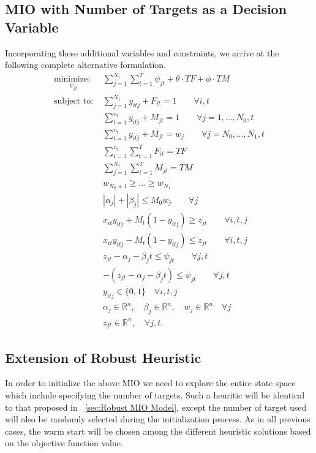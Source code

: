 \subsection{MIO with Number of Targets as a Decision Variable}
Incorporating these additional variables and constraints, we arrive at the following complete alternative formulation.
\begin{align*}
\underset{\psi_{jt}}{\text{minimize: }} & \sum_{j=1}^{N_{1}} \sum_{t=1}^{T} \psi_{jt} + \theta \cdot TF + \phi \cdot TM\\
\text{subject to: }	& \sum_{j=1}^{N_{1}} y_{itj} + F_{it} = 1 \qquad \forall i,t \nonumber\\
				& \sum_{i=1}^{n_{t}} y_{itj} + M_{jt} = 1 \qquad \forall j=1,...,N_{0},t \nonumber \\
				& \sum_{i=1}^{n_{t}} y_{itj} + M_{jt} = w_{j} \qquad \forall j=N_{0},...,N_{1},t \nonumber \\
				& \sum_{i=1}^{n_{t}} \sum_{t=1}^{T} F_{it} = TF \nonumber \\
				& \sum_{j=1}^{N_{1}} \sum_{t=1}^{T} M_{jt} = TM \nonumber \\
				& w_{N_0+1}\geq ...\geq w_{N_1} \nonumber \\
				& |\alpha_{j}|+|\beta_{j}| \leq M_{0}w_{j}\qquad \forall j \nonumber \\
				& x_{it}y_{itj} + M_{t}(1-y_{itj}) \geq z_{jt} \qquad \forall i,t,j \nonumber \\
				& x_{it}y_{itj} - M_{t}(1-y_{itj}) \leq z_{jt} \qquad \forall i,t,j \nonumber \\
				& z_{jt} - \alpha_{j} - \beta_{j}t \leq \psi_{jt} \qquad \forall j,t \nonumber \\
				& -(z_{jt} - \alpha_{j} - \beta_{j}t) \leq \psi_{jt} \qquad \forall j,t \nonumber \\
			 	& y_{itj} \in \{0,1\} \quad \forall i,t,j \nonumber \\
				& \alpha_{j} \in \mathbb{R}^n,\quad \beta_{j} \in \mathbb{R}^n,\quad w_{j} \in \mathbb{R}^n \quad \forall j \nonumber \\
				& z_{jt} \in \mathbb{R}^n, \quad \forall j,t. \nonumber
\end{align*}

\subsection{Extension of Robust Heuristic}
In order to initialize the above MIO we need to explore the entire state space which include specifying the number of targets. Such a heuritic will be identical to that proposed in \mysection~\ref{sec:Robust MIO Model}, except the number of target used will also be randomly  selected during the initialization process. As in all previous cases, the warm start will be chosen among the different heuristic solutions based on the objective function value.